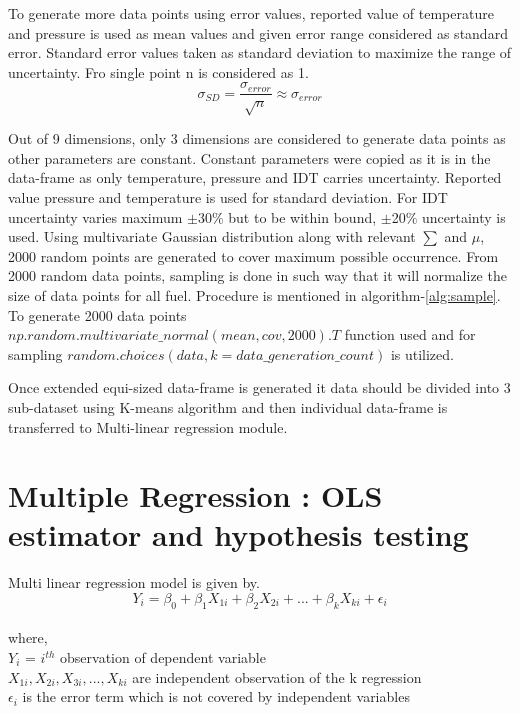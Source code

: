 \documentclass[preprint,12pt]{elsarticle}
\begin{document}
				To generate more data points using error values, reported value of temperature and pressure is used as mean values and given error range considered as standard error. Standard error values taken as standard deviation to maximize the range of uncertainty. Fro single point n is considered as 1.
				\begin{equation}\label{eq:error}
					\sigma_{SD} =\frac{\sigma_{error}}{\sqrt{n}} \approx \sigma_{error}
				\end{equation}
				
				Out of 9 dimensions, only 3 dimensions are considered to generate data points as other parameters are constant. Constant parameters were copied as it is in the data-frame as only temperature, pressure and IDT carries uncertainty.
				 Reported value pressure and temperature is used for standard deviation. For IDT uncertainty varies maximum $\pm$30$\%$ but to be within bound, $\pm$20$\%$ uncertainty is used. Using multivariate Gaussian distribution along with relevant $\sum$ and $\mu$, 2000 random points are generated to cover maximum possible occurrence. From 2000 random data points, sampling is done in such way that it will normalize the size of data points for all fuel. Procedure is mentioned in algorithm-\ref{alg:sample}. To generate 2000 data points $ np.random.multivariate\_normal(mean, cov, 2000).T $ function used and for sampling $random.choices(data, k=data\_generation\_count)$ is utilized. 
				 
				 Once extended equi-sized data-frame is generated it data should be divided into 3 sub-dataset using K-means algorithm and then individual data-frame is transferred to Multi-linear regression module.
				 
				 \section{Multiple Regression : OLS estimator and hypothesis testing }
				 Multi linear regression model is given by.
				 \begin{equation}
				 	Y_i = \beta_0 + \beta_1  X_{1i} +  \beta_2  X_{2i} + ... +  \beta_k  X_{ki} + \epsilon_i
				 \end{equation}  \\
				 where,\\
				  $Y_i$ = $i^{th}$ observation of dependent variable\\
				  $X_{1i},X_{2i},X_{3i},...,X_{ki}$ are independent observation of the k regression\\
				  $\epsilon_i$ is the error term which is not covered by independent variables
				  
\end{document}
